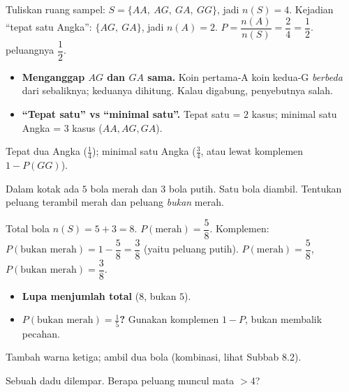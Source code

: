 \jawab
{} Tuliskan ruang sampel: $S=\{AA,\ AG,\ GA,\ GG\}$, jadi $n(S)=4$.
 Kejadian ``tepat satu Angka'': $\{AG,\ GA\}$, jadi $n(A)=2$.
 $P=\dfrac{n(A)}{n(S)}=\dfrac{2}{4}=\dfrac12$.
\jadi peluangnya $\dfrac12$.

\begin{jebakan}
\begin{itemize}[leftmargin=*,topsep=2pt]
  \item \textbf{Menganggap $AG$ dan $GA$ sama.} Koin pertama-A koin kedua-G
  \emph{berbeda} dari sebaliknya; keduanya dihitung. Kalau digabung, penyebutnya
  salah.
  \item \textbf{``Tepat satu'' vs ``minimal satu''.} Tepat satu = $2$ kasus;
  minimal satu Angka = $3$ kasus ($AA,AG,GA$).
\end{itemize}
\end{jebakan}

\begin{variasi}
Tepat dua Angka ($\frac14$); minimal satu Angka ($\frac34$, atau lewat komplemen
$1-P(GG)$).
\end{variasi}

\begin{soalbox}{}
Dalam kotak ada $5$ bola merah dan $3$ bola putih. Satu bola diambil. Tentukan
peluang terambil merah dan peluang \emph{bukan} merah.
\end{soalbox}

\jawab
{} Total bola $n(S)=5+3=8$.
 $P(\text{merah})=\dfrac{5}{8}$.
 Komplemen: $P(\text{bukan merah})=1-\dfrac58=\dfrac38$ (yaitu peluang
putih).
\jadi $P(\text{merah})=\dfrac58$, $P(\text{bukan merah})=\dfrac38$.

\begin{jebakan}
\begin{itemize}[leftmargin=*,topsep=2pt]
  \item \textbf{Lupa menjumlah total} ($8$, bukan $5$).
  \item \textbf{$P(\text{bukan merah})=\frac15$?} Gunakan komplemen $1-P$, bukan
  membalik pecahan.
\end{itemize}
\end{jebakan}

\begin{variasi}
Tambah warna ketiga; ambil dua bola (kombinasi, lihat Subbab 8.2).
\end{variasi}

\begin{soalbox}{}
Sebuah dadu dilempar. Berapa peluang muncul mata $>4$?
\end{soalbox}

